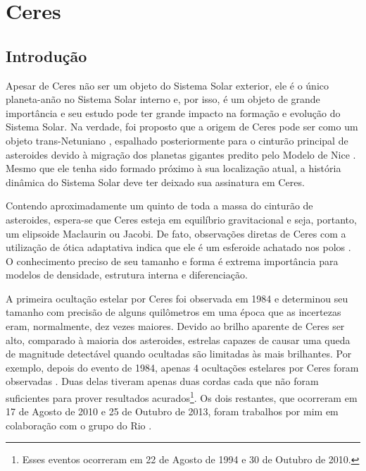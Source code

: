 \documentclass[12pt,a4paper]{monografia}
\begin{document}
\chapter{Ceres}
\label{Cap: Ceres}

\section{Introdução}
\label{Sec: Ceres-intro}

\indent \indent Apesar de Ceres não ser um objeto do Sistema Solar exterior, ele é o único planeta-anão no Sistema Solar interno e, por isso, é um objeto de grande importância e seu estudo pode ter grande impacto na formação e evolução do Sistema Solar. Na verdade, foi proposto que a origem de Ceres pode ser como um objeto trans-Netuniano \citep{McKinnon2012}, espalhado posteriormente para o cinturão principal de asteroides devido à migração dos planetas gigantes predito pelo Modelo de Nice \citep{Gomes2005}. Mesmo que ele tenha sido formado próximo à sua localização atual, a história dinâmica do Sistema Solar deve ter deixado sua assinatura em Ceres.

Contendo aproximadamente um quinto de toda a massa do cinturão de asteroides, espera-se que Ceres esteja em equilíbrio gravitacional e seja, portanto, um elipsoide Maclaurin ou Jacobi. De fato, observações diretas de Ceres com a utilização de ótica adaptativa indica que ele é um esferoide achatado nos polos \citep{Drummond2014}. O conhecimento preciso de seu tamanho e forma é extrema importância para modelos de densidade, estrutura interna e diferenciação.

A primeira ocultação estelar por Ceres foi observada em 1984 \citep{Millis1987} e determinou seu tamanho com precisão de alguns quilômetros em uma época que as incertezas eram, normalmente, dez vezes maiores. Devido ao brilho aparente de Ceres ser alto, comparado à maioria dos asteroides, estrelas capazes de causar uma queda de magnitude detectável quando ocultadas são limitadas às mais brilhantes. Por exemplo, depois do evento de 1984, apenas 4 ocultações estelares por Ceres foram observadas \citep{Dunham2014}. Duas delas tiveram apenas duas cordas cada que não foram suficientes para prover resultados acurados\footnote{Esses eventos ocorreram em 22 de Agosto de 1994 e 30 de Outubro de 2010.}. Os dois restantes, que ocorreram em 17 de Agosto de 2010 e 25 de Outubro de 2013, foram trabalhos por mim em colaboração com o grupo do Rio \citep{GomesJunior2015-Ceres}.
\end{document}
